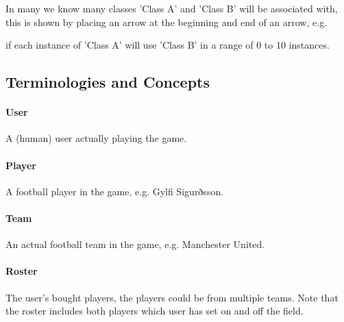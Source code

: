 \documentclass{article}
\begin{document}

In many we know many classes 'Class A' and 'Class B' will be associated with, this is shown by placing an arrow at the beginning and end of an arrow, e.g.


if each instance of 'Class A' will use 'Class B' in a range of 0 to 10 instances.

\subsection{Terminologies and Concepts}
\paragraph{User} A (human) user actually playing the game.
\paragraph{Player} A football player in the game, e.g. Gylfi Sigurðsson.
\paragraph{Team} An actual football team in the game, e.g. Manchester United.
\paragraph{Roster} The user's bought players, the players could be from multiple teams. Note that the roster includes both players which user has set on and off the field.
\end{document}
